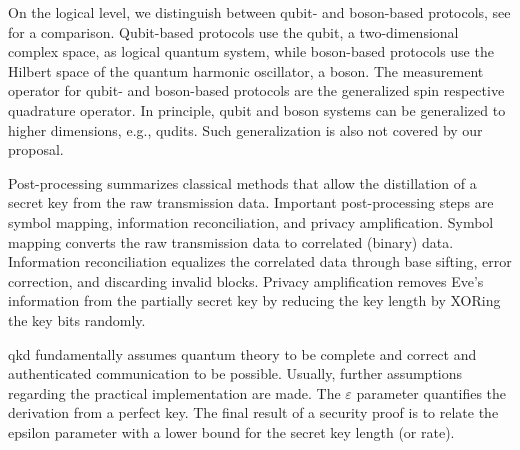 On the logical level, we distinguish between qubit- and boson-based protocols, see  for a comparison.
Qubit-based protocols use the qubit, a two-dimensional complex space, as logical quantum system, while boson-based protocols use the Hilbert space of the quantum harmonic oscillator, a boson.
The measurement operator for qubit- and boson-based protocols are the generalized spin respective quadrature operator.
In principle, qubit and boson systems can be generalized to higher dimensions, e.g., qudits.
Such generalization is also not covered by our proposal.

Post-processing summarizes classical methods that allow the distillation of a secret key from the raw transmission data.
Important post-processing steps are symbol mapping, information reconciliation, and privacy amplification.
Symbol mapping converts the raw transmission data to correlated (binary) data.
Information reconciliation equalizes the correlated data through base sifting, error correction, and discarding invalid blocks.
Privacy amplification removes Eve's information from the partially secret key by reducing the key length by XORing the key bits randomly.

\Gls{qkd} fundamentally assumes quantum theory to be complete and correct and authenticated communication to be possible.
Usually, further assumptions regarding the practical implementation are made.
The $\varepsilon$ parameter quantifies the derivation from a perfect key.
The final result of a security proof is to relate the epsilon parameter with a lower bound for the secret key length (or rate).